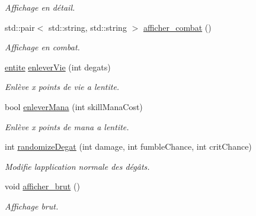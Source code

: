 \begin{DoxyCompactItemize}
\begin{DoxyCompactList}\small\item\em Affichage en détail. \end{DoxyCompactList}\item 
std\+::pair$<$ std\+::string, std\+::string $>$ \hyperlink{classentite_a32384fdc121c3994d52bcb7936abf09a}{afficher\+\_\+combat} ()
\begin{DoxyCompactList}\small\item\em Affichage en combat. \end{DoxyCompactList}\item 
\hyperlink{classentite}{entite} \hyperlink{classentite_a74d72bf499b3b3f9dab723cf0dd88d01}{enlever\+Vie} (int degats)
\begin{DoxyCompactList}\small\item\em Enlève x points de vie a l\textquotesingle{}entite. \end{DoxyCompactList}\item 
bool \hyperlink{classentite_a48c1c38c58bbfa074885ac45a2584772}{enlever\+Mana} (int skill\+Mana\+Cost)
\begin{DoxyCompactList}\small\item\em Enlève x points de mana a l\textquotesingle{}entite. \end{DoxyCompactList}\item 
int \hyperlink{classentite_a8f147ff4822de170f46850e5869e0d7d}{randomize\+Degat} (int damage, int fumble\+Chance, int crit\+Chance)
\begin{DoxyCompactList}\small\item\em Modifie l\textquotesingle{}application normale des dégâts. \end{DoxyCompactList}\item 
void \hyperlink{classentite_a4b1f0c17ffa7ca640b0eecd5a038873c}{afficher\+\_\+brut} ()
\begin{DoxyCompactList}\small\item\em Affichage brut. \end{DoxyCompactList}\end{DoxyCompactItemize}
